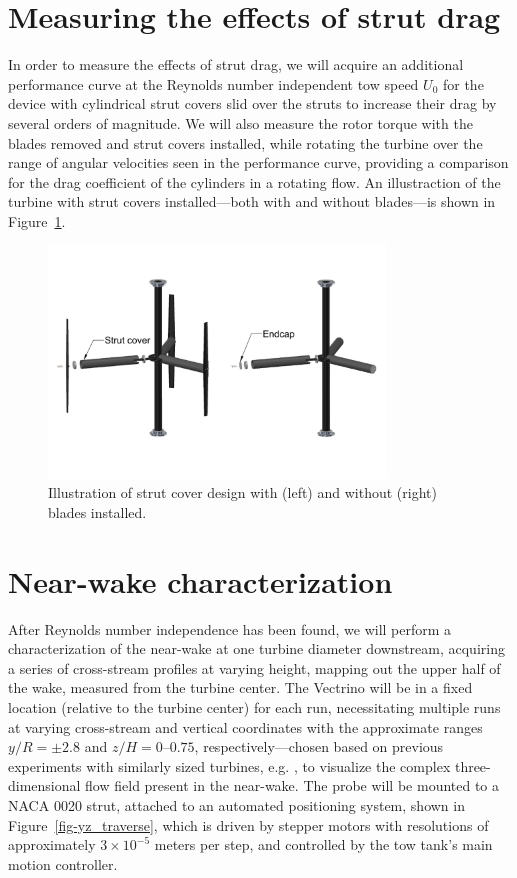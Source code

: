 \documentclass[12pt,letterpaper]{scrreprt}
\begin{document}
\section{Measuring the effects of strut drag}

In order to measure the effects of strut drag, we will acquire an additional
performance curve at the Reynolds number independent tow speed $U_0$ for the
device with cylindrical strut covers slid over the struts to increase their drag
by several orders of magnitude. We will also measure the rotor
torque with the blades removed and strut covers installed, while rotating the
turbine over the range of angular velocities seen in the performance curve,
providing a comparison for the drag coefficient of the cylinders in a rotating
flow. An illustraction of the turbine with strut covers installed---both with
and without blades---is shown in Figure~\ref{fig-strut_covers}.

\begin{figure}[!ht]
\centering
\includegraphics[width=0.8\textwidth]{Figures/strut_covers}
\caption{Illustration of strut cover design with (left) and without (right)
blades installed.}
\label{fig-strut_covers}
\end{figure}

\section{Near-wake characterization}

After Reynolds number independence has been found, we will perform a
characterization of the near-wake at one turbine diameter downstream, acquiring
a series of cross-stream profiles at varying height, mapping out the upper half
of the wake, measured from the turbine center. The Vectrino will be in a fixed
location (relative to the turbine center) for each run, necessitating multiple
runs at varying cross-stream and vertical coordinates with the approximate
ranges $y/R = \pm 2.8$ and $z/H = 0$--$0.75$, respectively---chosen based on
previous experiments with similarly sized turbines, e.g. \cite{Bachant2013}, to
visualize the complex three-dimensional flow field present in the near-wake. The
probe will be mounted to a NACA 0020 strut, attached to an automated positioning
system, shown in Figure~\ref{fig-yz_traverse}, which is driven by stepper motors
with resolutions of approximately $3 \times 10^{-5}$ meters per step, and
controlled by the tow tank's main motion controller.
\end{document}
